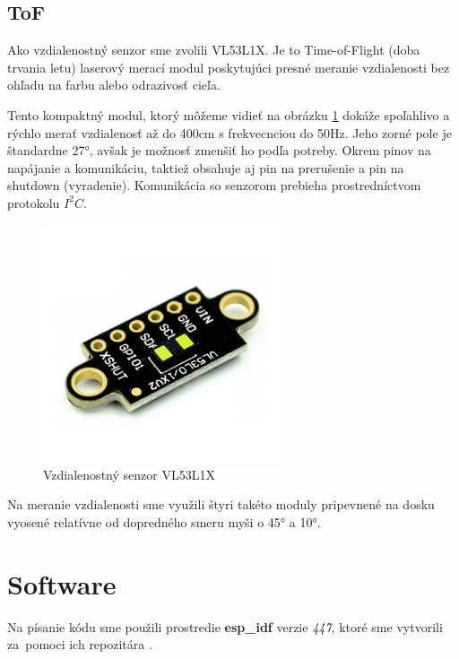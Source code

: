 \subsection{ToF}
Ako vzdialenostný senzor sme zvolili VL53L1X. Je to Time-of-Flight (doba trvania letu) laserový merací modul poskytujúci presné meranie vzdialenosti bez ohľadu na farbu alebo odrazivosť cieľa.

Tento kompaktný modul, ktorý môžeme vidieť na obrázku  \ref{fig:vl53l1x} dokáže spoľahlivo a rýchlo merať vzdialenosť až do 400cm s frekvecnciou do 50Hz. Jeho zorné pole je štandardne 27°, avšak je možnosť zmenšiť ho podľa potreby. Okrem pinov na napájanie a komunikáciu, taktiež obsahuje aj pin na prerušenie a pin na shutdown (vyradenie). Komunikácia so senzorom prebieha prostredníctvom protokolu $I^2 C$.

\begin{figure}[!htpb]
    \centering
    \includegraphics[width=7cm]{includes/images/vl53l1x.jpg}
    \caption{Vzdialenostný senzor VL53L1X}
    \label{fig:vl53l1x}
\end{figure}

Na meranie vzdialenosti sme využili štyri takéto moduly pripevnené na dosku vyosené relatívne od dopredného smeru myši o 45° a 10°.

\section{Software}
\label{sec:software}

Na písanie kódu sme použili prostredie \textbf{esp\_idf} verzie \textit{4\.4\.7}, ktoré sme vytvorili za~pomoci
ich repozitára \cite{espGithub}.

